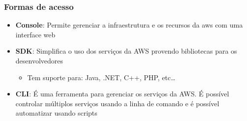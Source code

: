 \begin{frame}
	\frametitle{Formas de acesso}
	\begin{itemize}
		\item \textbf{Console}: Permite gerenciar a infraestrutura e os recursos da aws com uma interface web
		\item \textbf{SDK}: Simplifica o uso dos serviços da AWS provendo bibliotecas para os desenvolvedores
			\begin{itemize}
				\item Tem suporte para: Java, .NET, C++, PHP, etc\dots
			\end{itemize}
		\item \textbf{CLI}: É uma ferramenta para gerenciar os serviços da AWS. É possível controlar múltiplos serviços usando a linha de comando e é possível automatizar usando scripts
	\end{itemize}
\end{frame}
